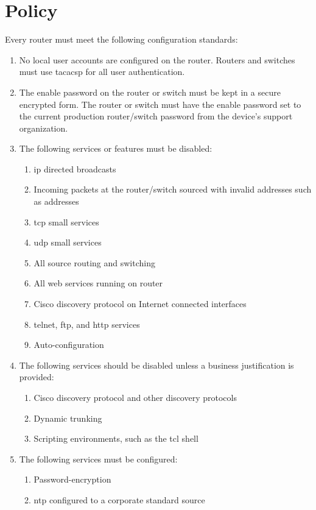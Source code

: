 \section{Policy}
Every router must meet the following configuration standards:
\begin{enumerate}
\item
No local user accounts are configured on the router.  
Routers and switches must use \gls{tacacsp} for all user authentication.
\item
The enable password on the router or switch must be kept in a secure encrypted form.  
The router or switch must have the enable password set to the current production router/switch password from the device's support organization.
\item
The following services or features must be disabled:
\begin{enumerate}
\item
\gls{ip} directed broadcasts 
\item
Incoming packets at the router/switch sourced with invalid addresses such as  addresses
\item
\gls{tcp} small services 
\item
\gls{udp} small services 
\item
All source routing and switching
\item
All web services running on router
\item
Cisco discovery protocol on Internet connected interfaces
\item
\gls{telnet}, \gls{ftp}, and \gls{http} services
\item
Auto-configuration
\end{enumerate}
\item
The following services should be disabled unless a business justification is provided:
\begin{enumerate}
\item 
Cisco discovery protocol and other discovery protocols
\item 
Dynamic trunking
\item 
Scripting environments, such as the \gls{tcl} shell
\end{enumerate}
\item
The following services must be configured:
\begin{enumerate}
\item 
Password-encryption
\item
\gls{ntp} configured to a corporate standard source
\end{enumerate}

\end{enumerate}
